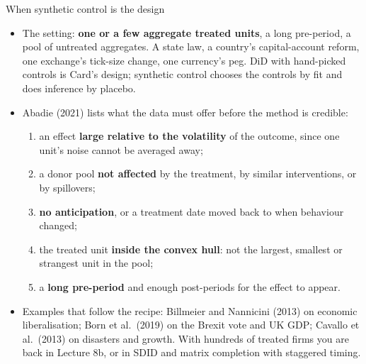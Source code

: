 \documentclass[
  11pt,
  ignorenonframetext,
  aspectratio=169,
]{beamer}
\providecommand{\tightlist}{%
  \setlength{\itemsep}{0pt}\setlength{\parskip}{0pt}}
\begin{document}
\begin{frame}{When synthetic control is the design}
\protect{}\label{when-synthetic-control-is-the-design}
\begin{itemize}
\tightlist
\item
  The setting: \textbf{one or a few aggregate treated units}, a long
  pre-period, a pool of untreated aggregates. A state law, a country's
  capital-account reform, one exchange's tick-size change, one
  currency's peg. DiD with hand-picked controls is Card's design;
  synthetic control chooses the controls by fit and does inference by
  placebo.
\item
  Abadie (2021) lists what the data must offer before the method is
  credible:

  \begin{enumerate}
  \tightlist
  \item
    an effect \textbf{large relative to the volatility} of the outcome,
    since one unit's noise cannot be averaged away;
  \item
    a donor pool \textbf{not affected} by the treatment, by similar
    interventions, or by spillovers;
  \item
    \textbf{no anticipation}, or a treatment date moved back to when
    behaviour changed;
  \item
    the treated unit \textbf{inside the convex hull}: not the largest,
    smallest or strangest unit in the pool;
  \item
    a \textbf{long pre-period} and enough post-periods for the effect to
    appear.
  \end{enumerate}
\item
  Examples that follow the recipe: Billmeier and Nannicini (2013) on
  economic liberalisation; Born et al.~(2019) on the Brexit vote and UK
  GDP; Cavallo et al.~(2013) on disasters and growth. With hundreds of
  treated firms you are back in Lecture 8b, or in SDID and matrix
  completion with staggered timing.
\end{itemize}
\end{frame}
\end{document}
